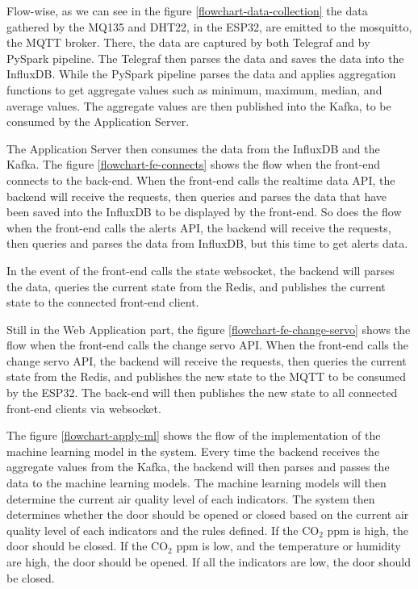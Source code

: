 Flow-wise, as we can see in the figure
\ref{flowchart-data-collection} the data gathered
by the MQ135 and DHT22, in the ESP32, are emitted
to the mosquitto, the MQTT broker. There, the data
are captured by both Telegraf and by PySpark
pipeline. The Telegraf then parses the data and
saves the data into the InfluxDB. While the PySpark
pipeline parses the data and applies aggregation
functions to get aggregate values such as minimum,
maximum, median, and average values. The aggregate
values are then published into the Kafka, to be
consumed by the Application Server.

The Application Server then consumes the data from
the InfluxDB and the Kafka. The figure
\ref{flowchart-fe-connects} shows the flow when the
front-end connects to the back-end. When the
front-end calls the realtime data API, the backend
will receive the requests, then queries and parses
the data that have been saved into the InfluxDB to
be displayed by the front-end.
So does the flow when the front-end calls the
alerts API, the backend will receive the requests,
then queries and parses the data from InfluxDB, but this time to get alerts data.

In the event of the front-end calls the state
websocket, the backend will parses the data,
queries the current state from the Redis, and
publishes the current state to the connected
front-end client.

Still in the Web Application part, the figure
\ref{flowchart-fe-change-servo} shows the flow when
the front-end calls the change servo API. When the
front-end calls the change servo API, the backend
will receive the requests, then queries the current
state from the Redis, and publishes the new state
to the MQTT to be consumed by the ESP32. The back-end will then publishes the new state to all connected front-end clients via websocket.

The figure \ref{flowchart-apply-ml} shows the flow
of the implementation of the machine learning
model in the system. Every time the backend receives
the aggregate values from the Kafka, the backend
will then parses and passes the data to the machine
learning models. The machine learning models will
then determine the current air quality level of
each indicators. The system then determines whether
the door should be opened or closed based on the
current air quality level of each indicators and
the rules defined. If the CO$_2$ ppm is high, the
door should be closed. If the CO$_2$ ppm is low,
and the temperature or humidity are high, the door
should be opened. If all the indicators are low,
the door should be closed.

